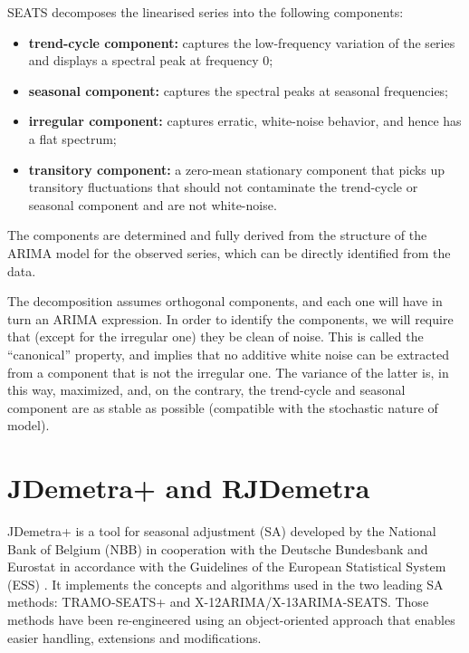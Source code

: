 \documentclass[article]{jss}
\providecommand{\tightlist}{%
  \setlength{\itemsep}{0pt}\setlength{\parskip}{0pt}}
\begin{document}
SEATS decomposes the linearised series into the following components:

\begin{itemize}
\tightlist
\item
  \textbf{trend-cycle component:} captures the low-frequency variation
  of the series and displays a spectral peak at frequency 0;\\
\item
  \textbf{seasonal component:} captures the spectral peaks at seasonal
  frequencies;\\
\item
  \textbf{irregular component:} captures erratic, white-noise behavior,
  and hence has a flat spectrum;\\
\item
  \textbf{transitory component:} a zero-mean stationary component that
  picks up transitory fluctuations that should not contaminate the
  trend-cycle or seasonal component and are not white-noise.
\end{itemize}

The components are determined and fully derived from the structure of
the ARIMA model for the observed series, which can be directly
identified from the data.

The decomposition assumes orthogonal components, and each one will have
in turn an ARIMA expression. In order to identify the components, we
will require that (except for the irregular one) they be clean of noise.
This is called the ``canonical'' property, and implies that no additive
white noise can be extracted from a component that is not the irregular
one. The variance of the latter is, in this way, maximized, and, on the
contrary, the trend-cycle and seasonal component are as stable as
possible (compatible with the stochastic nature of model).

\hypertarget{jdemetra-and-rjdemetra}{%
\section{JDemetra+ and RJDemetra}\label{jdemetra-and-rjdemetra}}

JDemetra+ is a tool for seasonal adjustment (SA) developed by the
National Bank of Belgium (NBB) in cooperation with the Deutsche
Bundesbank and Eurostat in accordance with the Guidelines of the
European Statistical System (ESS) \citep{eurostat2015guidelines}. It
implements the concepts and algorithms used in the two leading SA
methods: TRAMO-SEATS+ and X-12ARIMA/X-13ARIMA-SEATS. Those methods have
been re-engineered using an object-oriented approach that enables easier
handling, extensions and modifications.
\end{document}
